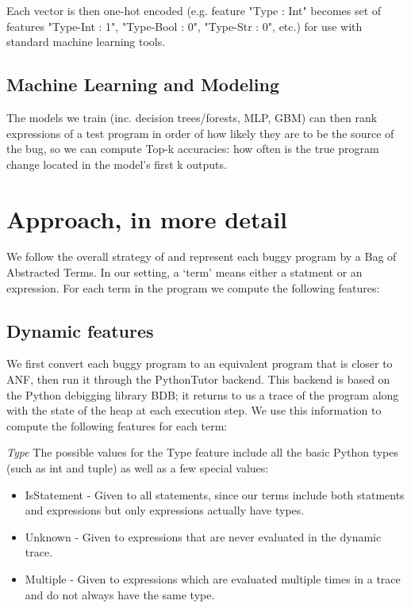 \documentclass[conference]{IEEEtran}
\begin{document}
Each vector is then one-hot encoded (e.g. feature "Type : Int" becomes set
of features "Type-Int : 1", "Type-Bool : 0", "Type-Str : 0", etc.) for use with
standard machine learning tools.

\subsection{Machine Learning and Modeling}
\label{sec-model}

The models we train (inc. decision trees/forests,
MLP, GBM) can then rank expressions of a test program in order of how likely they
are to be the source of the bug, so we can compute Top-k accuracies: how often
is the true program change located in the model's first k outputs.

\section{Approach, in more detail}

We follow the overall strategy of \cite{learning-to-blame} and represent each
buggy program by a Bag of Abstracted Terms. In our setting, a `term' means either
a statment or an expression. For each term in the program we compute the following features:

\subsection{Dynamic features}

We first convert each buggy program to an equivalent program that is closer
to ANF, then run it through the PythonTutor backend. This backend is based on the
Python debigging library BDB; it returns to us a trace of the program along with
the state of the heap at each execution step. We use this information to compute
the following features for each term:

\emph{Type} The possible values for the Type feature include all the basic Python
types (such as int and tuple) as well as a few special values:
\begin{itemize}
    \item IsStatement - Given to all statements, since our terms include both
    statments and expressions but only expressions actually have types.
    \item Unknown - Given to expressions that are never evaluated in the dynamic
    trace.
    \item Multiple - Given to expressions which are evaluated multiple times in
    a trace and do not always have the same type.
\end{itemize}
\end{document}
